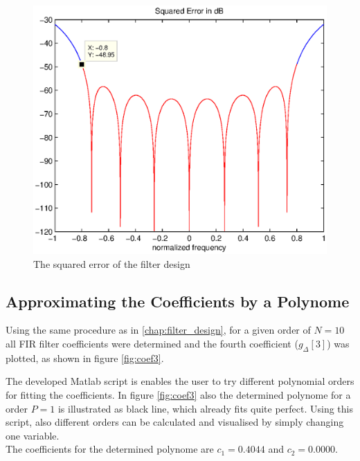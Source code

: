 \begin{figure}[h]
\centering
\includegraphics[width=\textwidth]{pics/fig2.eps}
\caption{The squared error of the filter design}
\label{fig:error}
\end{figure}

\subsection{Approximating the Coefficients by a Polynome}
\label{chap:poly}
Using the same procedure as in \ref{chap:filter_design}, for a given order of $N=10$ all FIR filter coefficients were determined and the fourth coefficient ($g_\Delta [3]$) was plotted, as shown in figure \ref{fig:coef3}.

The developed Matlab script is enables the user to try different polynomial orders for fitting the coefficients. In figure \ref{fig:coef3} also the determined polynome for a order $P=1$ is illustrated as black line, which already fits quite perfect. Using this script, also different orders can be calculated and visualised by simply changing one variable.\\
The coefficients for the determined polynome are $c_1 = 0.4044$ and $c_2 = 0.0000$.

